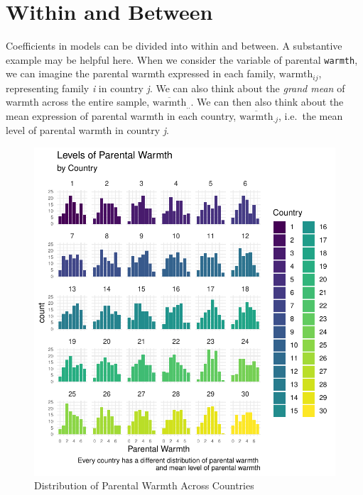 \documentclass[
  letterpaper,
  DIV=11,
  numbers=noendperiod]{scrreprt}
\begin{document}
\hypertarget{sec-withinbetween}{%
\section{Within and Between}\label{sec-withinbetween}}

Coefficients in models can be divided into within and between. A
substantive example may be helpful here. When we consider the variable
of parental \texttt{warmth}, we can imagine the parental warmth
expressed in each family, \(\text{warmth}_{ij}\), representing family
\emph{i} in country \emph{j}. We can also think about the \emph{grand
mean} of warmth across the entire sample,
\(\overline{\text{warmth}}_{..}\). We can then also think about the mean
expression of parental warmth in each country,
\(\overline{\text{warmth}}_{.j}\), i.e.~the mean level of parental
warmth in country \emph{j}.

\begin{figure}

{\centering \includegraphics{cross-sectional_files/figure-pdf/fig-distributionwarmth-1.pdf}

}

\caption{\label{fig-distributionwarmth}Distribution of Parental Warmth
Across Countries}

\end{figure}
\end{document}

